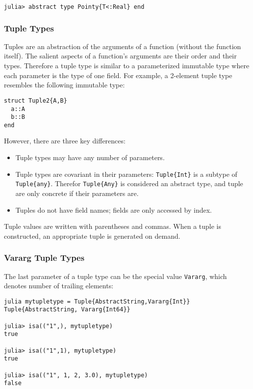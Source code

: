 \documentclass[
]{article}
\providecommand{\tightlist}{%
  \setlength{\itemsep}{0pt}\setlength{\parskip}{0pt}}
\begin{document}
\begin{verbatim}
julia> abstract type Pointy{T<:Real} end
\end{verbatim}

\hypertarget{tuple-types}{%
\subsubsection{Tuple Types}\label{tuple-types}}

Tuples are an abstraction of the arguments of a function (without the
function itself). The salient aspects of a function's arguments are
their order and their types. Therefore a tuple type is similar to a
parameterized immutable type where each parameter is the type of one
field. For example, a 2-element tuple type resembles the following
immutable type:

\begin{verbatim}
struct Tuple2{A,B}
  a::A
  b::B
end
\end{verbatim}

However, there are three key differences:

\begin{itemize}
\tightlist
\item
  Tuple types may have any number of parameters.
\item
  Tuple types are covariant in their parameters: \texttt{Tuple\{Int\}}
  is a subtype of \texttt{Tuple\{any\}}. Therefor \texttt{Tuple\{Any\}}
  is considered an abstract type, and tuple are only concrete if their
  parameters are.
\item
  Tuples do not have field names; fields are only accessed by index.
\end{itemize}

Tuple values are written with parentheses and commas. When a tuple is
constructed, an appropriate tuple is generated on demand.

\hypertarget{vararg-tuple-types}{%
\subsubsection{Vararg Tuple Types}\label{vararg-tuple-types}}

The last parameter of a tuple type can be the special value
\texttt{Vararg}, which denotes number of trailing elements:

\begin{verbatim}
julia mytupletype = Tuple{AbstractString,Vararg{Int}}
Tuple{AbstractString, Vararg{Int64}}

julia> isa(("1",), mytupletype)
true

julia> isa(("1",1), mytupletype)
true

julia> isa(("1", 1, 2, 3.0), mytupletype)
false
\end{verbatim}
\end{document}
